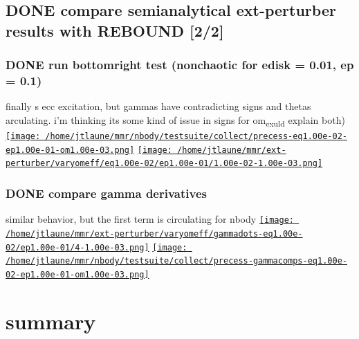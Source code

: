 \documentclass[11pt]{article}
\begin{document}
\subsection{{\bfseries\sffamily DONE} compare semianalytical ext-perturber results with REBOUND [2/2]}
\label{sec:org4f8f382}
\subsubsection{{\bfseries\sffamily DONE} run bottomright test (nonchaotic for edisk = 0.01, ep = 0.1)}
\label{sec:org6c0397c}
finally s ecc excitation, but gammas have contradicting signs and
thetas arculating. i'm thinking its some kind of issue in signs
for om\textsubscript{exuld} explain both)
\href{nbestsuite/collect/precess-eq1.00e-02-ep1.00e-01-om1.00e-03.png}{\texttt{[image: /home/jtlaune/mmr/nbody/testsuite/collect/precess-eq1.00e-02-ep1.00e-01-om1.00e-03.png]}}
\href{exturber/varyomeff/eq1.00e-02/ep1.00e-01/1.00e-02-1.00e-03.png}{\texttt{[image: /home/jtlaune/mmr/ext-perturber/varyomeff/eq1.00e-02/ep1.00e-01/1.00e-02-1.00e-03.png]}}
\subsubsection{{\bfseries\sffamily DONE} compare gamma derivatives}
\label{sec:org733fa51}
similar behavior, but the first term is circulating for nbody
\href{ext-perturber/varyomeff/gammadots-eq1.00e-02/ep1.00e-01/4-1.00e-03.png}{\texttt{[image: /home/jtlaune/mmr/ext-perturber/varyomeff/gammadots-eq1.00e-02/ep1.00e-01/4-1.00e-03.png]}}
\href{nbody/testsuite/collect/precess-gammacomps-eq1.00e-02-ep1.00e-01-om1.00e-03.png}{\texttt{[image: /home/jtlaune/mmr/nbody/testsuite/collect/precess-gammacomps-eq1.00e-02-ep1.00e-01-om1.00e-03.png]}}
\section{summary}
\label{sec:org4d826dd}
\end{document}
